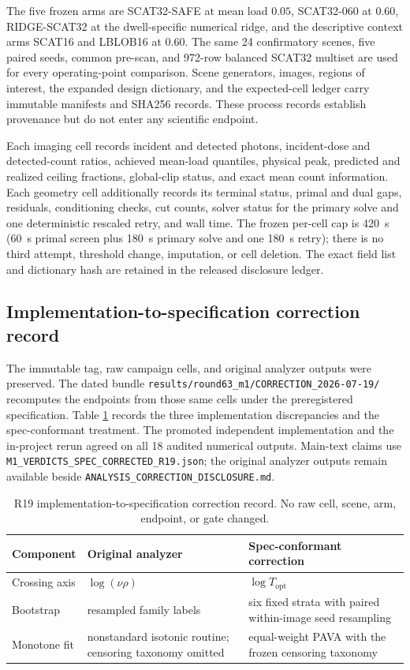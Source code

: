 \documentclass[10pt]{article}
\begin{document}
The five frozen arms are SCAT32-SAFE at mean load $0.05$, SCAT32-060 at
$0.60$, RIDGE-SCAT32 at the dwell-specific numerical ridge, and the descriptive
context arms SCAT16 and LBLOB16 at $0.60$. The same 24 confirmatory scenes,
five paired seeds, common pre-scan, and 972-row balanced SCAT32 multiset are
used for every operating-point comparison. Scene generators, images, regions
of interest, the expanded design dictionary, and the expected-cell ledger carry
immutable manifests and SHA256 records. These process records establish
provenance but do not enter any scientific endpoint.

Each imaging cell records incident and detected photons, incident-dose and
detected-count ratios, achieved mean-load quantiles, physical peak, predicted
and realized ceiling fractions, global-clip status, and exact mean count
information. Each geometry cell additionally records its terminal status,
primal and dual gaps, residuals, conditioning checks, cut counts, solver status
for the primary solve and one deterministic rescaled retry, and wall time. The
frozen per-cell cap is 420~s (60~s primal screen plus 180~s primary solve and
one 180~s retry); there is no third attempt, threshold change, imputation, or
cell deletion. The exact field list and dictionary hash are retained in the
released disclosure ledger.

\subsection{Implementation-to-specification correction record}
The immutable tag, raw campaign cells, and original analyzer outputs were
preserved. The dated bundle
\texttt{results/round63\_m1/CORRECTION\_2026-07-19/} recomputes the endpoints
from those same cells under the preregistered specification. Table
\ref{tab:s-correction} records the three implementation discrepancies and the
spec-conformant treatment. The promoted independent implementation and the
in-project rerun agreed on all 18 audited numerical outputs. Main-text claims
use \texttt{M1\_VERDICTS\_SPEC\_CORRECTED\_R19.json}; the original analyzer
outputs remain available beside
\texttt{ANALYSIS\_CORRECTION\_DISCLOSURE.md}.

\begin{table}[t]
\centering
\caption{R19 implementation-to-specification correction record. No raw cell,
scene, arm, endpoint, or gate changed.}
\label{tab:s-correction}
\small
\setlength{\tabcolsep}{5pt}
\begin{tabular}{@{}p{}p{}p{}@{}}
\hline
Component & Original analyzer & Spec-conformant correction \\
\hline
Crossing axis & $\log(\nu\rho)$ & $\log T_{\mathrm{opt}}$ \\
Bootstrap & resampled family labels & six fixed strata with paired within-image seed resampling \\
Monotone fit & nonstandard isotonic routine; censoring taxonomy omitted & equal-weight PAVA with the frozen censoring taxonomy \\
\hline
\end{tabular}
\end{table}
\end{document}
